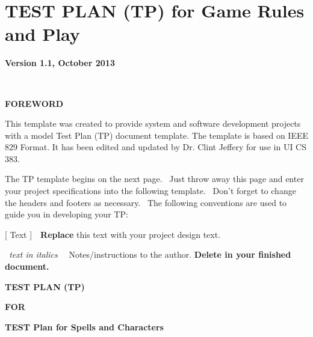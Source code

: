 \chapter{TEST PLAN (TP) for Game Rules and Play}

{\centering{}\bfseries\color{black}
Version 1.1, October 2013
\par}

\ 

{\centering{}\bfseries\color{black}
FOREWORD
\par}

{\color{black}
This template was created to provide system and software development
projects with a model Test Plan (TP) document template.
The template is based on IEEE 829 Format.
It has been edited and updated by
Dr. Clint Jeffery for use in UI CS 383.}

{\color{black}
The TP template begins on the next page. \ Just throw away this page
and enter your project specifications into the following template.
\ Don{\textquoteright}t forget to change the headers and footers as
necessary. \ The following conventions are used to guide you in
developing your TP:}

{\color{black}
\foreignlanguage{english}{[ Text
]\ \ }\foreignlanguage{english}{\textbf{Replace}}\foreignlanguage{english}{
this text with your project design text.}}

{\color{black}
\foreignlanguage{english}{\textit{\ }}\foreignlanguage{english}{\textit{text
in italics }}\foreignlanguage{english}{\ \ Notes/instructions to the
author. }\foreignlanguage{english}{\textbf{Delete in your finished
document.}}}


\bigskip

{\centering\bfseries\color{black}
TEST PLAN (TP)}

{\centering{}\bfseries\color{black}
FOR
\par}


\bigskip

{\centering{}\bfseries\color{black}
TEST Plan for Spells and Characters
\par}


\bigskip


\bigskip


\bigskip

\begin{figure}
\centering
\end{figure}

